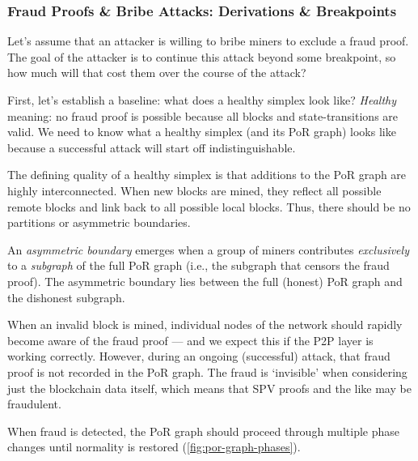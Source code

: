 \subsubsection{Fraud Proofs \& Bribe Attacks: Derivations \& Breakpoints}

\label{sec:fps-and-bribes}

Let's assume that an attacker is willing to bribe miners to exclude a fraud proof.
The goal of the attacker is to continue this attack beyond some breakpoint, so how much will that cost them over the course of the attack?

First, let's establish a baseline: what does a healthy simplex look like?
\emph{Healthy} meaning: no fraud proof is possible because all blocks and state-transitions are valid.
We need to know what a healthy simplex (and its PoR graph) looks like because a successful attack will start off indistinguishable.

The defining quality of a healthy simplex is that additions to the PoR graph are highly interconnected.
When new blocks are mined, they reflect all possible remote blocks and link back to all possible local blocks.
Thus, there should be no partitions or asymmetric boundaries.

An \emph{asymmetric boundary} emerges when a group of miners contributes \emph{exclusively} to a \emph{subgraph} of the full PoR graph (i.e., the subgraph that censors the fraud proof).
The asymmetric boundary lies between the full (honest) PoR graph and the dishonest subgraph.



When an invalid block is mined, individual nodes of the network should rapidly become aware of the fraud proof --- and we expect this if the P2P layer is working correctly.
However, during an ongoing (successful) attack, that fraud proof is not recorded in the PoR graph.
The fraud is `invisible' when considering just the blockchain data itself, which means that SPV proofs and the like may be fraudulent.

When fraud is detected, the PoR graph should proceed through multiple phase changes until normality is restored (\autoref{fig:por-graph-phases}).


